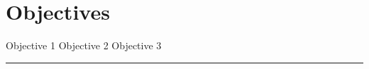 
\section*{Objectives}
\begin{outline}
    \1 Objective 1
    \1 Objective 2
    \1 Objective 3
\end{outline}


\rule[0.0051in]{\textwidth}{0.00025in}
